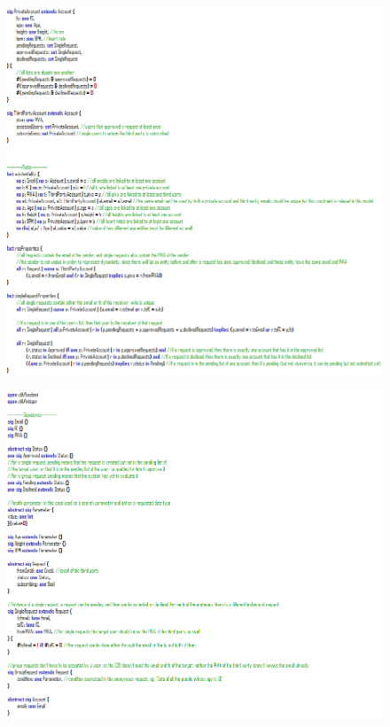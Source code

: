 \documentclass[titlepage]{article}
\begin{document}
		\begin{figure}[H]
			\center
  			\includegraphics[width=\textwidth]{Alloy/Dynamic1.png}
			\label{fig:dyn1}
		\end{figure}

		\begin{figure}[H]
			\center
  			\includegraphics[width=\textwidth]{Alloy/Dynamic2.png}
			\label{fig:dyn2}
		\end{figure}
\end{document}
